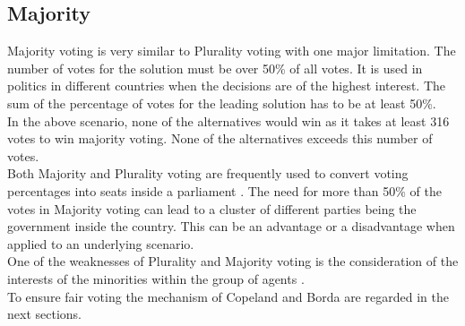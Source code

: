 \documentclass[german, a4paper, 11pt, oneside]{scrbook}
\begin{document}
\subsection{Majority}
Majority voting is very similar to Plurality voting with one major limitation. The number of votes for the solution must be over 50\% of all votes. It is used in politics in different countries when the decisions are of the highest interest. The sum of the percentage of votes for the leading solution has to be at least 50\%.\\  In the above scenario, none of the alternatives would win as it takes at least 316 votes to win majority voting. None of the alternatives exceeds this number of votes. \\Both Majority and Plurality voting are frequently used to convert voting percentages into seats inside a parliament \cite{Blais.1988}. The need for more than 50\% of the votes in Majority voting can lead to a cluster of different parties being the government inside the country. This can be an advantage or a disadvantage when applied to an underlying scenario. \\One of the weaknesses of Plurality and Majority voting is the consideration of the interests of the minorities within the group of agents \cite{Brandt}. \\To ensure fair voting the mechanism of Copeland and Borda are regarded in the next sections.
\end{document}
